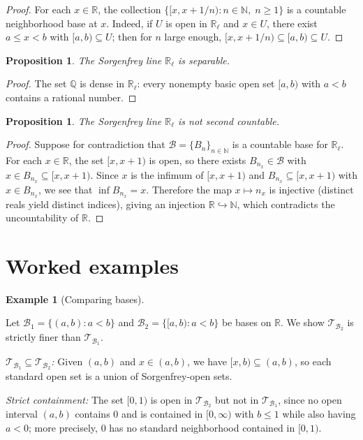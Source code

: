 \documentclass[11pt,a4paper,twoside]{book}
\newtheorem{proposition}[theorem]{Proposition}
\theoremstyle{remark}
\theoremstyle{definition}
\newtheorem{exampleplain}[theorem]{Example}
\theoremstyle{definition}
\newenvironment{example}[1][]{%
  \begin{exampleplain}[#1]\itshape
}{%
  \end{exampleplain}
}
\begin{document}
\begin{proof}
For each $x\in\mathbb{R}$, the collection
$\{[x, x+1/n) : n\in\mathbb{N},\;n\ge 1\}$ is a countable neighborhood base
at $x$.  Indeed, if $U$ is open in $\mathbb{R}_\ell$ and $x\in U$, there exist
$a\le x<b$ with $[a,b)\subseteq U$; then for $n$ large enough,
$[x,x+1/n)\subseteq [a,b)\subseteq U$.
\end{proof}

\begin{proposition}
\label{prop:sorgenfrey-separable}
The Sorgenfrey line $\mathbb{R}_\ell$ is separable.
\end{proposition}

\begin{proof}
The set $\mathbb{Q}$ is dense in $\mathbb{R}_\ell$: every nonempty basic open
set $[a,b)$ with $a<b$ contains a rational number.
\end{proof}

\begin{proposition}
\label{prop:sorgenfrey-not-second-countable}
The Sorgenfrey line $\mathbb{R}_\ell$ is not second countable.
\end{proposition}

\begin{proof}
Suppose for contradiction that $\mathscr{B}=\{B_n\}_{n\in\mathbb{N}}$ is a
countable base for $\mathbb{R}_\ell$.  For each $x\in\mathbb{R}$, the set
$[x,x+1)$ is open, so there exists $B_{n_x}\in\mathscr{B}$ with
$x\in B_{n_x}\subseteq [x,x+1)$.  Since $x$ is the infimum of $[x,x+1)$ and
$B_{n_x}\subseteq [x,x+1)$ with $x\in B_{n_x}$, we see that $\inf B_{n_x}=x$.
Therefore the map $x\mapsto n_x$ is injective (distinct reals yield distinct
indices), giving an injection $\mathbb{R}\hookrightarrow\mathbb{N}$, which
contradicts the uncountability of $\mathbb{R}$.
\end{proof}

\section{Worked examples}
\label{sec:bases-worked}

\begin{example}[Comparing bases]
\label{ex:comparing-bases}
Let $\mathscr{B}_1=\{(a,b):a<b\}$ and
$\mathscr{B}_2=\{[a,b):a<b\}$ be bases on $\mathbb{R}$.  We show
$\mathscr{T}_{\mathscr{B}_2}$ is strictly finer than
$\mathscr{T}_{\mathscr{B}_1}$.

\emph{$\mathscr{T}_{\mathscr{B}_1}\subseteq\mathscr{T}_{\mathscr{B}_2}$:}\;
Given $(a,b)$ and $x\in(a,b)$, we have $[x,b)\subseteq(a,b)$, so each standard
open set is a union of Sorgenfrey-open sets.

\emph{Strict containment:}\; The set $[0,1)$ is open in
$\mathscr{T}_{\mathscr{B}_2}$ but not in $\mathscr{T}_{\mathscr{B}_1}$,
since no open interval $(a,b)$ contains $0$ and is contained in $[0,\infty)$
with $b\le 1$ while also having $a<0$; more precisely, $0$ has no standard
neighborhood contained in $[0,1)$.
\end{example}
\end{document}
